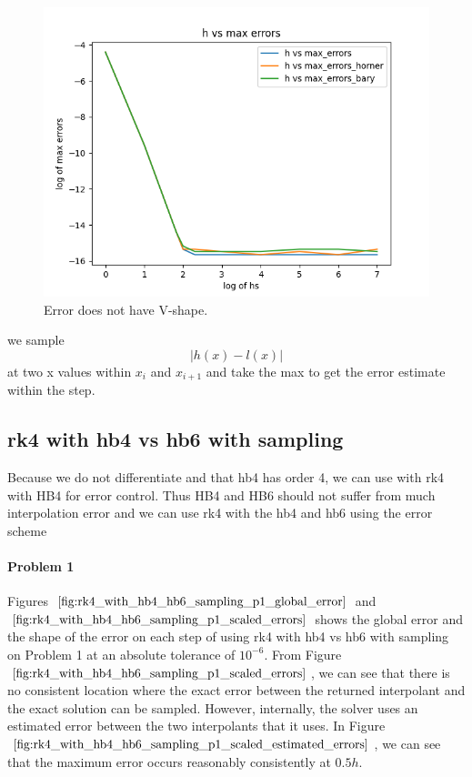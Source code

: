 \begin{figure}[H]
\centering
\includegraphics[width=0.7\linewidth]{./figures/further_work_error_is_not_v_shape_hb6}
\caption{Error does not have V-shape.}
\label{fig:error_is_not_v_shape}
\end{figure}

we sample
\begin{equation}
| h(x) - l(x) |
\end{equation}
at two x values within $x_i$ and $x_{i+1}$ and take the max to get the error estimate within the step.

\subsection{rk4 with hb4 vs hb6 with sampling}
Because we do not differentiate and that hb4 has order 4, we can use with rk4 with HB4 for error control. Thus HB4 and HB6 should not suffer from much interpolation error and we can use rk4 with the hb4 and hb6 using the error scheme

\paragraph{Problem 1} Figures $\ref{fig:rk4_with_hb4_hb6_sampling_p1_global_error}$ and $\ref{fig:rk4_with_hb4_hb6_sampling_p1_scaled_errors}$ shows the global error and the shape of the error on each step of using rk4 with hb4 vs hb6 with sampling on Problem 1 at an absolute tolerance of $10^{-6}$. From Figure $\ref{fig:rk4_with_hb4_hb6_sampling_p1_scaled_errors}$, we can see that there is no consistent location where the exact error between the returned interpolant and the exact solution can be sampled. However, internally, the solver uses an estimated error between the two interpolants that it uses. In Figure $\ref{fig:rk4_with_hb4_hb6_sampling_p1_scaled_estimated_errors}$, we can see that the maximum error occurs reasonably consistently at $0.5h$.

